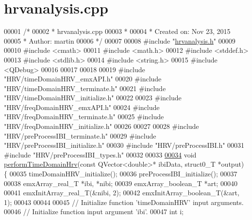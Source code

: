 \hypertarget{hrvanalysis_8cpp_source}{}\section{hrvanalysis.\+cpp}
\label{hrvanalysis_8cpp_source}

\begin{DoxyCode}
00001 \textcolor{comment}{/*}
00002 \textcolor{comment}{ * hrvanalysis.cpp}
00003 \textcolor{comment}{ *}
00004 \textcolor{comment}{ *  Created on: Nov 23, 2015}
00005 \textcolor{comment}{ *      Author: martin}
00006 \textcolor{comment}{ */}
00007 
00008 \textcolor{preprocessor}{#include "\hyperlink{hrvanalysis_8h}{hrvanalysis.h}"}
00009 
00010 \textcolor{preprocessor}{#include <cmath>}
00011 \textcolor{preprocessor}{#include <math.h>}
00012 \textcolor{preprocessor}{#include <stddef.h>}
00013 \textcolor{preprocessor}{#include <stdlib.h>}
00014 \textcolor{preprocessor}{#include <string.h>}
00015 \textcolor{preprocessor}{#include <QDebug>}
00016 
00017 
00018 
00019 \textcolor{preprocessor}{#include "HRV/timeDomainHRV\_emxAPI.h"}
00020 \textcolor{preprocessor}{#include "HRV/timeDomainHRV\_terminate.h"}
00021 \textcolor{preprocessor}{#include "HRV/timeDomainHRV\_initialize.h"}
00022 
00023 \textcolor{preprocessor}{#include "HRV/freqDomainHRV\_emxAPI.h"}
00024 \textcolor{preprocessor}{#include "HRV/freqDomainHRV\_terminate.h"}
00025 \textcolor{preprocessor}{#include "HRV/freqDomainHRV\_initialize.h"}
00026 
00027 
00028 \textcolor{preprocessor}{#include "HRV/preProcessIBI\_terminate.h"}
00029 \textcolor{preprocessor}{#include "HRV/preProcessIBI\_initialize.h"}
00030 \textcolor{preprocessor}{#include "HRV/preProcessIBI.h"}
00031 \textcolor{preprocessor}{#include "HRV/preProcessIBI\_types.h"}
00032 
00033 
\hypertarget{hrvanalysis_8cpp_source.tex_l00034}{}\hyperlink{group__HRV-Analysis_ga2bd6c358a622e01babb7fdbca313c50f}{00034} \textcolor{keywordtype}{void} \hyperlink{group__HRV-Analysis_ga2bd6c358a622e01babb7fdbca313c50f}{performTimeDomainHrv}(\textcolor{keyword}{const} QVector<double>* ibiData, struct0\_T *output) \{
00035     timeDomainHRV\_initialize();
00036     preProcessIBI\_initialize();
00037 
00038     emxArray\_real\_T *ibi, *nibi;
00039      emxArray\_boolean\_T *art;
00040 
00041     emxInitArray\_real\_T(&nibi, 2);
00042     emxInitArray\_boolean\_T(&art, 1);
00043 
00044 
00045     \textcolor{comment}{// Initialize function 'timeDomainHRV' input arguments.}
00046     \textcolor{comment}{// Initialize function input argument 'ibi'.}
00047     \textcolor{keywordtype}{int} i;

\end{DoxyCode}
